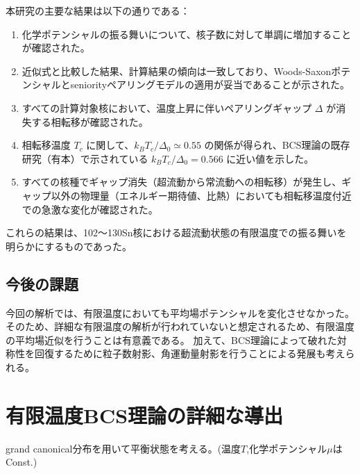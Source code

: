 \documentclass[a4paper,11pt]{jsreport}
\begin{document}
  本研究の主要な結果は以下の通りである：
  \begin{enumerate}
      \item 化学ポテンシャルの振る舞いについて、核子数に対して単調に増加することが確認された。
      \item 近似式と比較した結果、計算結果の傾向は一致しており、Woods-Saxonポテンシャルとseniorityペアリングモデルの適用が妥当であることが示された。
      \item すべての計算対象核において、温度上昇に伴いペアリングギャップ $\Delta$ が消失する相転移が確認された。
      \item 相転移温度 $T_c$ に関して、$k_B T_c/\Delta_0 \simeq 0.55$ の関係が得られ、BCS理論の既存研究（有本\cite{arimoto}）で示されている $k_B T_c/\Delta_0=0.566$ に近い値を示した。
      \item すべての核種でギャップ消失（超流動から常流動への相転移）が発生し、ギャップ以外の物理量（エネルギー期待値、比熱）においても相転移温度付近での急激な変化が確認された。
  \end{enumerate}

  これらの結果は、102〜130Sn核における超流動状態の有限温度での振る舞いを明らかにするものであった。
  \section{今後の課題}
  今回の解析では、有限温度においても平均場ポテンシャルを変化させなかった。
  そのため、詳細な有限温度の解析が行われていないと想定されるため、有限温度の平均場近似を行うことは有意義である。
  加えて、BCS理論によって破れた対称性を回復するために粒子数射影、角運動量射影を行うことによる発展も考えられる。



\appendix
\chapter{有限温度BCS理論の詳細な導出}\label{FTBCS導出}
  grand canonical分布を用いて平衡状態を考える。(温度$T$,化学ポテンシャル$\mu$はConst.)
  
\end{document}
